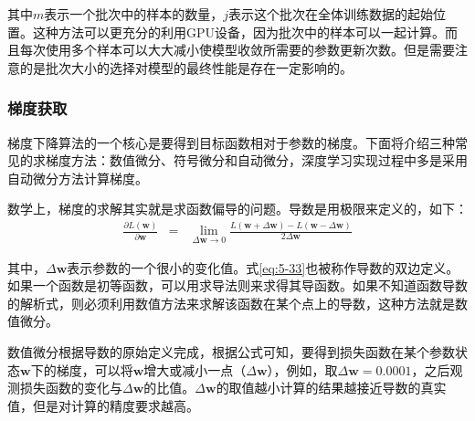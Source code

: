 \noindent 其中$ m $表示一个批次中的样本的数量，$ j $表示这个批次在全体训练数据的起始位置。这种方法可以更充分的利用GPU设备，因为批次中的样本可以一起计算。而且每次使用多个样本可以大大减小使模型收敛所需要的参数更新次数。但是需要注意的是批次大小的选择对模型的最终性能是存在一定影响的。


\subsubsection{梯度获取}

\parinterval 梯度下降算法的一个核心是要得到目标函数相对于参数的梯度。下面将介绍三种常见的求梯度方法：数值微分、符号微分和自动微分，深度学习实现过程中多是采用自动微分方法计算梯度\cite{baydin2017automatic}。

%

\vspace{0.5em}
\vspace{0.5em}

\parinterval 数学上，梯度的求解其实就是求函数偏导的问题。导数是用极限来定义的，如下：
\begin{eqnarray}
\frac{\partial L(\mathbf w)}{\partial \mathbf w}&=&\lim\limits_{\Delta \mathbf w \to 0}\frac{L(\mathbf w+\Delta \mathbf w)-L(\mathbf w-\Delta \mathbf w)}{2\Delta \mathbf w}
\label{eq:5-33}
\end{eqnarray}

\noindent 其中，$ \Delta \mathbf w $表示参数的一个很小的变化值。式\ref{eq:5-33}也被称作导数的双边定义。如果一个函数是初等函数，可以用求导法则来求得其导函数。如果不知道函数导数的解析式，则必须利用数值方法来求解该函数在某个点上的导数，这种方法就是数值微分。

\parinterval 数值微分根据导数的原始定义完成，根据公式可知，要得到损失函数在某个参数状态$ \mathbf w $下的梯度，可以将$ \mathbf w $增大或减小一点（$ \Delta \mathbf w $），例如，取$ \Delta \mathbf w=0.0001 $，之后观测损失函数的变化与$ \Delta \mathbf w $的比值。$ \Delta \mathbf w $的取值越小计算的结果越接近导数的真实值，但是对计算的精度要求越高。

